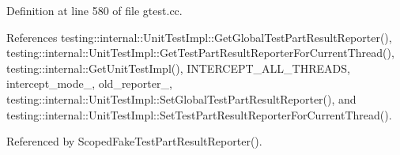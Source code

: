 Definition at line 580 of file gtest.\+cc.



References testing\+::internal\+::\+Unit\+Test\+Impl\+::\+Get\+Global\+Test\+Part\+Result\+Reporter(), testing\+::internal\+::\+Unit\+Test\+Impl\+::\+Get\+Test\+Part\+Result\+Reporter\+For\+Current\+Thread(), testing\+::internal\+::\+Get\+Unit\+Test\+Impl(), I\+N\+T\+E\+R\+C\+E\+P\+T\+\_\+\+A\+L\+L\+\_\+\+T\+H\+R\+E\+A\+DS, intercept\+\_\+mode\+\_\+, old\+\_\+reporter\+\_\+, testing\+::internal\+::\+Unit\+Test\+Impl\+::\+Set\+Global\+Test\+Part\+Result\+Reporter(), and testing\+::internal\+::\+Unit\+Test\+Impl\+::\+Set\+Test\+Part\+Result\+Reporter\+For\+Current\+Thread().



Referenced by Scoped\+Fake\+Test\+Part\+Result\+Reporter().


